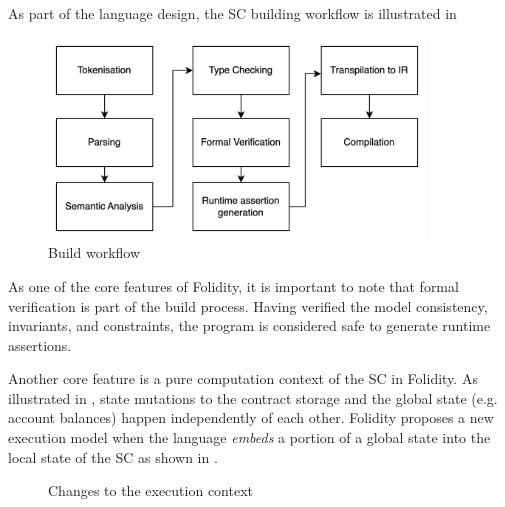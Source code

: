 \documentclass[oneside]{ecsproject}     %
\begin{document}
As part of the language design, the SC building workflow is illustrated in 

\begin{figure}[!htb]
  \centering
  \includegraphics[width=10cm]{compilation.png}
  \caption{Build workflow}
  \label{Figure:compilation}
\end{figure}

As one of the core features of Folidity, it is important to note that formal verification is part of the build process.
Having verified the model consistency, invariants, and constraints, the program is considered safe to generate runtime assertions.

Another core feature is a pure computation context of the SC in Folidity. As illustrated in ,
state mutations to the contract storage and the global state (e.g. account balances) happen independently of each other. 
Folidity proposes a new execution model when the language \textit{embeds} a portion of a global state into the local state of the SC 
as shown in . 

\begin{figure}[!htb]
  \centering
  \caption{Changes to the execution context}
  \label{Figure:context}
\end{figure}
\end{document}
